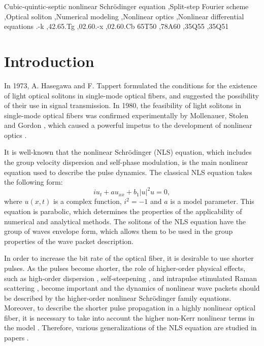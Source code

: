 \documentclass[preprint,12pt]{elsarticle}
\begin{document}
\begin{frontmatter}
\begin{keyword}
Cubic-quintic-septic nonlinear Schr\"{o}dinger equation \sep Split-step Fourier scheme \sep Optical soliton \sep Numerical modeling \sep Nonlinear optics \sep Nonlinear differential equations
.-k \sep 42.65.Tg \sep 02.60.-x \sep 02.60.Cb
\MSC 65T50 \sep 78A60 \sep 35Q55 \sep 35Q51

\end{keyword}

\end{frontmatter}


\section{Introduction}\label{sec0}

In 1973, A. Hasegawa and F. Tappert formulated the conditions for the existence of light optical solitons in single-mode optical fibers, and suggested the possibility of their use in signal transmission\cite{Rad19,Hasegawa1973}.  In 1980, the feasibility of light solitons in single-mode optical fibers was confirmed experimentally by Mollenauer, Stolen and Gordon \cite{Rad01,Rad02}, which caused a powerful impetus to the development of nonlinear optics \cite{Rad14,Rad15,Rad16,Rad03}.

It is well-known that the nonlinear Schr\"{o}dinger (NLS) equation, which includes the group velocity dispersion and self-phase modulation, is the main nonlinear equation used to describe the pulse dynamics. The classical NLS equation takes the following form:
\begin{equation}\label{eq1}
iu_{t}+a u_{xx}+b_{1}|u|^2 u=0,
\end{equation}
where \(u(x,t)\) is a complex function, \(i^{2}=-1\) and \(a\) is a model parameter. This equation is parabolic, which determines the properties of the applicability of numerical and analytical methods. The solitons of the NLS equation have the group of waves envelope form, which allows them to be used in the group properties of the wave packet description.

In order to increase the bit rate of the optical fiber, it is desirable to use shorter pulses. As the pulses become shorter, the role of higher-order physical effects, such as high-order dispersion \cite{Rad5,Rad8,Rad020,Rad014,Rad016}, self-steepening \cite{UZUNOV2022170137}, and intrapulse stimulated Raman scattering \cite{WANG2022120667,GROMOV201488}, become important and the dynamics of nonlinear wave packets should be described by the higher-order nonlinear Schr\"{o}dinger family equations. Moreover, to describe the shorter pulse propagation in a highly nonlinear optical fiber, it is necessary to take into account the higher non-Kerr nonlinear terms in the model \cite{Rad9,Rad015,Rad017,Rad018,Rad019}. Therefore, various generalizations of the NLS equation are studied in papers \cite{Rad10,Rad11,Rad17,Rad18}. 
\end{document}
